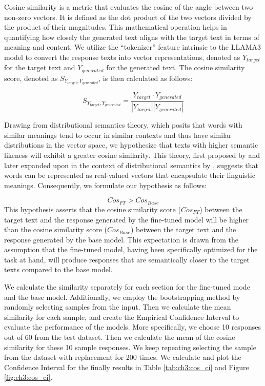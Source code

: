 Cosine similarity is a metric that evaluates the cosine of the angle between two non-zero vectors. It is defined as the dot product of the two vectors divided by the product of their magnitudes. This mathematical operation helps in quantifying how closely the generated text aligns with the target text in terms of meaning and content. We utilize the ``tokenizer'' feature intrinsic to the LLAMA3 model to convert the response texts into vector representations, denoted as $Y_{target}$ for the target text and $Y_{generated}$ for the generated text. The cosine similarity score, denoted as $S_{Y_{target}, Y_{generated}}$, is then calculated as follows:

\begin{equation*}
    S_{Y_{target}, Y_{generated}} = \frac{Y_{target} \cdot Y_{generated}}{|Y_{target}| |Y_{generated}|}
\end{equation*}

Drawing from distributional semantics theory, which posits that words with similar meanings tend to occur in similar contexts and thus have similar distributions in the vector space, we hypothesize that texts with higher semantic likeness will exhibit a greater cosine similarity. This theory, first proposed by \cite{firth1957linguistics} and later expanded upon in the context of distributional semantics by \cite{sahlgren2008distributional}, suggests that words can be represented as real-valued vectors that encapsulate their linguistic meanings. Consequently, we formulate our hypothesis as follows:

\begin{equation*}
    Cos_{FT} > Cos_{Base}
\end{equation*}
This hypothesis asserts that the cosine similarity score ($Cos_{FT}$) between the target text  and the response generated by the fine-tuned model will be higher than the cosine similarity score ($Cos_{Base}$) between the target text and the response generated by the base model. This expectation is drawn from the assumption that the fine-tuned model, having been specifically optimized for the task at hand, will produce responses that are semantically closer to the target texts compared to the base model.




We calculate the similarity separately for each section for the fine-tuned mode and the base model. Additionally, we employ the bootstrapping method by randomly selecting samples from the input. Then we calculate the mean similarity for each sample, and create the Empirical Confidence Interval to evaluate the performance of the models. More specifically, we choose 10 responses out of 60 from the test dataset. Then we calculate the mean of the cosine similarity for these 10 sample responses. We keep repeating selecting the sample from the dataset with replacement for 200 times. We calculate and plot the Confidence Interval for the finally results in Table \ref{tab:ch3:cos_ci} and Figure \ref{fig:ch3:cos_ci}.

